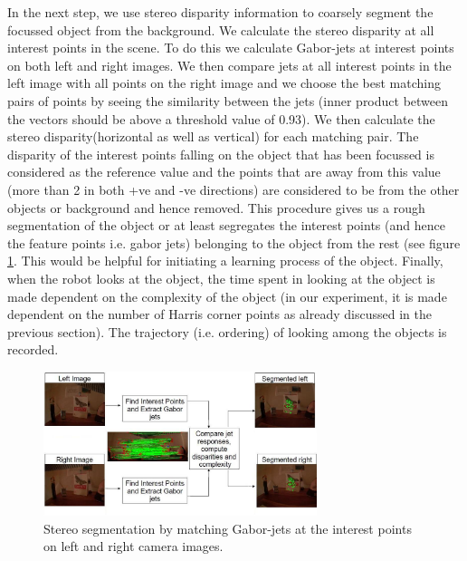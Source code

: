\documentclass[conference]{IEEEtran}
\begin{document}
In the next step, we use stereo disparity information to coarsely segment the focussed object from the background. We calculate the stereo disparity at all interest points in the scene. To do this we calculate Gabor-jets at interest points on both left and right images. We then compare jets at all interest points in the left image with all points on the right image and we choose the best matching pairs of points by seeing the similarity between the jets (inner product between the vectors should be above a threshold value of 0.93). We then calculate the stereo disparity(horizontal as well as vertical) for each matching pair. The disparity of the interest points falling on the object that has been focussed is considered as the reference value and the points that are away from this value (more than 2 in both +ve and -ve directions) are considered to be from the other objects or background and hence removed. This procedure gives us a rough segmentation of the object or at least segregates the interest points (and hence the feature points i.e. gabor jets) belonging to the object from the rest (see figure \ref{fig:matching}. This would be helpful for initiating a learning process of the object. Finally, when the robot looks at the object, the time spent in looking at the object is made dependent on the complexity of the object (in our experiment, it is made dependent on the number of Harris corner points as already discussed in the previous section). The trajectory (i.e. ordering) of looking among the objects is recorded.
\begin{figure} [!tbp]
\centering
\includegraphics[width=8.0cm]{matching1.jpg}
\caption{Stereo segmentation by matching Gabor-jets at the interest points on left and right camera images.}
\label{fig:matching}
\end{figure}
\end{document}
